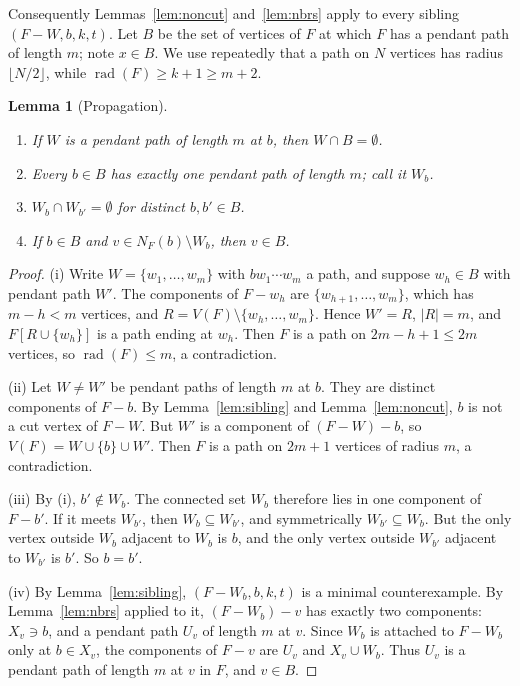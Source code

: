 \documentclass[11pt,a4paper]{article}
\newtheorem{lemma}[theorem]{Lemma}
\theoremstyle{definition}
\newcommand{\rad}{\operatorname{rad}}
\begin{document}
Consequently Lemmas~\ref{lem:noncut} and~\ref{lem:nbrs} apply to every sibling $(F-W,b,k,t)$. Let $B$ be the set of vertices of $F$ at which $F$ has a pendant path of length $m$; note $x\in B$. We use repeatedly that a path on $N$ vertices has radius $\lfloor N/2\rfloor$, while $\rad(F)\ge k+1\ge m+2$.

\begin{lemma}[Propagation]\label{lem:prop}
\leavevmode
\begin{enumerate}[label=\textup{(\roman*)}]
\item If $W$ is a pendant path of length $m$ at $b$, then $W\cap B=\emptyset$.
\item Every $b\in B$ has exactly one pendant path of length $m$; call it $W_b$.
\item $W_b\cap W_{b'}=\emptyset$ for distinct $b,b'\in B$.
\item If $b\in B$ and $v\in N_F(b)\setminus W_b$, then $v\in B$.
\end{enumerate}
\end{lemma}

\begin{proof}
(i) Write $W=\{w_1,\dots,w_m\}$ with $bw_1\cdots w_m$ a path, and suppose $w_h\in B$ with pendant path $W'$. The components of $F-w_h$ are $\{w_{h+1},\dots,w_m\}$, which has $m-h<m$ vertices, and $R=V(F)\setminus\{w_h,\dots,w_m\}$. Hence $W'=R$, $|R|=m$, and $F[R\cup\{w_h\}]$ is a path ending at $w_h$. Then $F$ is a path on $2m-h+1\le 2m$ vertices, so $\rad(F)\le m$, a contradiction.

(ii) Let $W\ne W'$ be pendant paths of length $m$ at $b$. They are distinct components of $F-b$. By Lemma~\ref{lem:sibling} and Lemma~\ref{lem:noncut}, $b$ is not a cut vertex of $F-W$. But $W'$ is a component of $(F-W)-b$, so $V(F)=W\cup\{b\}\cup W'$. Then $F$ is a path on $2m+1$ vertices of radius $m$, a contradiction.

(iii) By (i), $b'\notin W_b$. The connected set $W_b$ therefore lies in one component of $F-b'$. If it meets $W_{b'}$, then $W_b\subseteq W_{b'}$, and symmetrically $W_{b'}\subseteq W_b$. But the only vertex outside $W_b$ adjacent to $W_b$ is $b$, and the only vertex outside $W_{b'}$ adjacent to $W_{b'}$ is $b'$. So $b=b'$.

(iv) By Lemma~\ref{lem:sibling}, $(F-W_b,b,k,t)$ is a minimal counterexample. By Lemma~\ref{lem:nbrs} applied to it, $(F-W_b)-v$ has exactly two components: $X_v\ni b$, and a pendant path $U_v$ of length $m$ at $v$. Since $W_b$ is attached to $F-W_b$ only at $b\in X_v$, the components of $F-v$ are $U_v$ and $X_v\cup W_b$. Thus $U_v$ is a pendant path of length $m$ at $v$ in $F$, and $v\in B$.
\end{proof}
\end{document}
